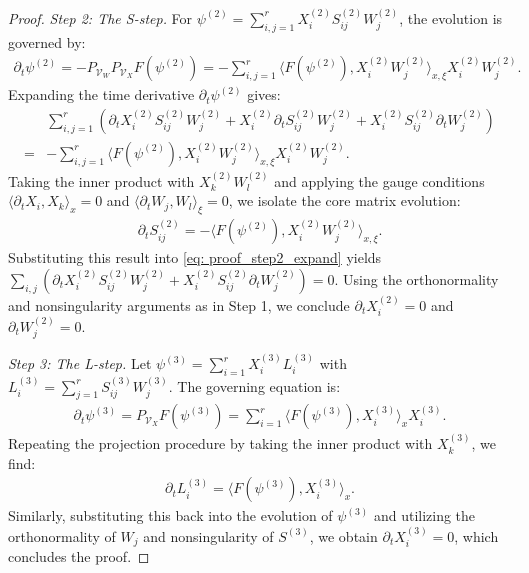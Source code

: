 \documentclass[10pt,a4paper]{amsart}
\begin{document}
\begin{proof}
    \textit{Step 2: The S-step.} 
    For $\psi^{(2)} = \sum_{i,j=1}^r X_i^{(2)} S_{ij}^{(2)} W_j^{(2)}$, the evolution is governed by:
    \begin{align*}
        \partial_t \psi^{(2)} = -P_{\mathcal{V}_W} P_{\mathcal{V}_X} F(\psi^{(2)}) = -\sum_{i,j=1}^r \langle F(\psi^{(2)}), X_i^{(2)} W_j^{(2)} \rangle_{x,\xi} X_i^{(2)} W_j^{(2)}.
    \end{align*}
    Expanding the time derivative $\partial_t \psi^{(2)}$ gives:
    \begin{equation}\label{eq: proof_step2_expand}
    \begin{aligned}
        &\sum_{i,j=1}^r \left( \partial_t X_i^{(2)} S_{ij}^{(2)} W_j^{(2)} + X_i^{(2)} \partial_t S_{ij}^{(2)} W_j^{(2)} + X_i^{(2)} S_{ij}^{(2)} \partial_t W_j^{(2)} \right) \\
        =& -\sum_{i,j=1}^r \langle F(\psi^{(2)}), X_i^{(2)} W_j^{(2)} \rangle_{x,\xi} X_i^{(2)} W_j^{(2)}.
    \end{aligned}
    \end{equation}
    Taking the inner product with $X_k^{(2)} W_l^{(2)}$ and applying the gauge conditions $\langle \partial_t X_i, X_k \rangle_x = 0$ and $\langle \partial_t W_j, W_l \rangle_\xi = 0$, we isolate the core matrix evolution:
    \begin{align*}
        \partial_t S_{ij}^{(2)} = -\langle F(\psi^{(2)}), X_i^{(2)} W_j^{(2)} \rangle_{x,\xi}.
    \end{align*}
    Substituting this result into \eqref{eq: proof_step2_expand} yields $\sum_{i,j} (\partial_t X_i^{(2)} S_{ij}^{(2)} W_j^{(2)} + X_i^{(2)} S_{ij}^{(2)} \partial_t W_j^{(2)}) = 0$. Using the orthonormality and nonsingularity arguments as in Step 1, we conclude $\partial_t X_i^{(2)} = 0$ and $\partial_t W_j^{(2)} = 0$.

    \textit{Step 3: The L-step.} 
    Let $\psi^{(3)} = \sum_{i=1}^r X_i^{(3)} L_i^{(3)}$ with $L_i^{(3)} = \sum_{j=1}^r S_{ij}^{(3)} W_j^{(3)}$. The governing equation is:
    \begin{align*}
        \partial_t \psi^{(3)} = P_{\mathcal{V}_X} F(\psi^{(3)}) = \sum_{i=1}^r \langle F(\psi^{(3)}), X_i^{(3)} \rangle_{x} X_i^{(3)}.
    \end{align*}
    Repeating the projection procedure by taking the inner product with $X_k^{(3)}$, we find:
    \begin{align*}
        \partial_t L_i^{(3)} = \langle F(\psi^{(3)}), X_i^{(3)} \rangle_{x}.
    \end{align*}
    Similarly, substituting this back into the evolution of $\psi^{(3)}$ and utilizing the orthonormality of $W_j$ and nonsingularity of $S^{(3)}$, we obtain $\partial_t X_i^{(3)} = 0$, which concludes the proof.
\end{proof}
\end{document}
